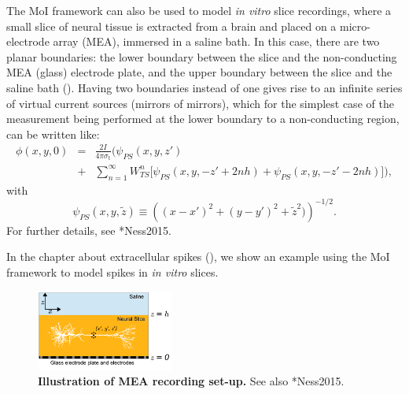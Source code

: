 The MoI framework can also be used to model {\it in vitro} slice recordings, 
where a small slice of neural tissue is extracted from a brain and placed on a micro-electrode array (MEA), 
immersed in a saline bath. In this case, there are two planar boundaries:
the lower boundary between the slice and the non-conducting MEA (glass) electrode plate, 
and the upper boundary between the slice and the saline bath ().
Having two boundaries instead of one gives rise to an infinite series of virtual current sources (mirrors of mirrors),
which for the simplest case of the measurement being performed at the lower boundary 
to a non-conducting region, can be written like:
\begin{eqnarray}
\label{eq:Sigma:moi_PS}
\phi(x,y,0) & =  & \frac{2I}{4\pi \sigma_\text{t}} \bigg( \psi_{PS}(x,y,z')  \nonumber \\
& + & \sum_{n=1}^{\infty} W_{TS}^n\bigg[ \psi_{PS}(x,y,-z' + 2nh) + \psi_{PS}(x,y,-z' - 2nh) \bigg ]\bigg),
\end{eqnarray}
with 
\begin{equation}
\psi_{PS}(x,y,\tilde z) \equiv \left((x-x')^2 + (y-y')^2 + \tilde z^2)\right)^{-1/2}.
\end{equation}
For further details, see \citeasnoun**{Ness2015}.

In the chapter about extracellular spikes (), we show an example using the MoI framework
to model spikes in {\it in vitro} slices. 

\begin{figure}[!ht]
\begin{center}
\includegraphics[width=0.4\textwidth]{Figures/Sigma/MEA_illustration.pdf}
\end{center}
\caption[]{\textbf{Illustration of MEA recording set-up.}
See also \citeasnoun**{Ness2015}.
}
\label{fig:Sigma:MEA_illustration}
\end{figure}



